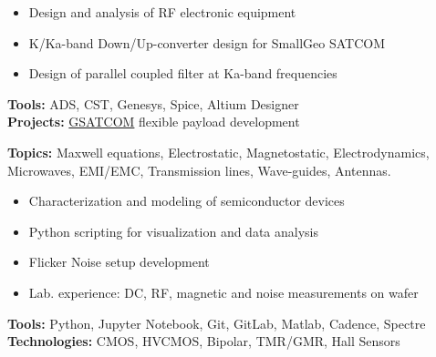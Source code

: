 \documentclass[10pt,a4paper]{altacv}
\begin{document}

{}
\justifying

\medskip
\begin{itemize}
    \item Design and analysis of RF electronic equipment
    \item K/Ka-band Down/Up-converter design for SmallGeo SATCOM
    \item Design of parallel coupled filter at Ka-band frequencies
\end{itemize}
\medskip
\small{
\textbf{Tools:} ADS, CST, Genesys, Spice, Altium Designer \\
\textbf{Projects:} \href{https://www.gsatcom.com}{GSATCOM} flexible payload development\\
}

\divider


\small{
\textbf{Topics:} Maxwell equations, Electrostatic, Magnetostatic, Electrodynamics, Microwaves, EMI/EMC, Transmission lines, Wave-guides, Antennas.\\
}

\divider

\medskip
\begin{itemize}
    \item Characterization and modeling of semiconductor devices
    \item Python scripting for visualization and data analysis
    \item Flicker Noise setup development
    \item Lab. experience: DC, RF, magnetic and noise measurements on wafer
\end{itemize}
\medskip
\small{
\textbf{Tools:} Python, Jupyter Notebook, Git, GitLab, Matlab, Cadence, Spectre \\
\textbf{Technologies:} CMOS, HVCMOS, Bipolar, TMR/GMR, Hall Sensors \\
}
\end{document}
